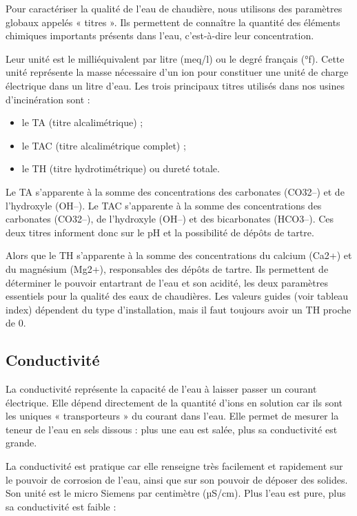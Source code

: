 Pour caractériser la qualité de l’eau de chaudière, nous utilisons des paramètres globaux appelés « titres ». Ils permettent de connaître la quantité des éléments chimiques importants présents dans l’eau, c’est-à-dire leur concentration.
\vspace{0.3cm}

Leur unité est le milliéquivalent par litre (meq/l) ou le degré français (°f). Cette unité représente la masse nécessaire d’un ion pour constituer une unité de charge électrique dans un litre d’eau.
Les trois principaux titres utilisés dans nos usines d’incinération sont :


\begin{itemize}
\item  le TA (titre alcalimétrique) ;
\item  le TAC (titre alcalimétrique complet) ;
\item  le TH (titre hydrotimétrique) ou dureté totale.

\end{itemize}

Le TA s’apparente à la somme des concentrations des carbonates (CO32–) et de l’hydroxyle (OH–).
Le TAC s’apparente à la somme des concentrations des carbonates (CO32–), de l’hydroxyle (OH–) et des bicarbonates (HCO3–).
Ces deux titres informent donc sur le pH et la possibilité de dépôts de tartre.
\vspace{0.3cm}

Alors que le TH s’apparente à la somme des concentrations du calcium (Ca2+) et du magnésium (Mg2+), responsables des dépôts de tartre.
Ils permettent de déterminer le pouvoir entartrant de l’eau et son acidité, les deux paramètres essentiels pour la qualité des eaux de chaudières.
Les valeurs guides (voir tableau index)  dépendent du type d’installation, mais il faut toujours avoir un TH proche de 0.


\subsection{Conductivité}

La conductivité représente la capacité de l’eau à laisser passer un courant électrique. Elle dépend directement de la quantité d’ions en solution car ils sont les uniques « transporteurs » du courant dans l’eau. Elle permet de mesurer la teneur de l’eau en sels dissous : plus une eau est salée, plus sa conductivité est grande.
\vspace{0.3cm}

La conductivité est pratique car elle renseigne très facilement et rapidement sur le pouvoir de corrosion de l’eau, ainsi que sur son pouvoir de déposer des solides.
Son unité est le micro Siemens par centimètre (µS/cm).
Plus l’eau est pure, plus sa conductivité est faible :


